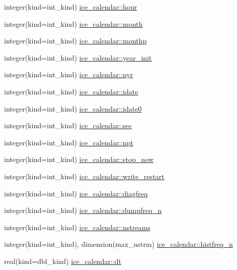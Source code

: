 \begin{DoxyCompactItemize}
integer(kind=int\_\-kind) \hyperlink{namespaceice__calendar_a0d6f497f4cdeb0413e2c5eadca76d8a1}{ice\_\-calendar::hour}
\item 
integer(kind=int\_\-kind) \hyperlink{namespaceice__calendar_a97f8410cf5a5f94b8c2a271c080c4bd7}{ice\_\-calendar::month}
\item 
integer(kind=int\_\-kind) \hyperlink{namespaceice__calendar_a2e88fbbaa94dea7baf4d46c950c5be7a}{ice\_\-calendar::monthp}
\item 
integer(kind=int\_\-kind) \hyperlink{namespaceice__calendar_afc3c91ad4e19b987b1e28293ec6ec2b7}{ice\_\-calendar::year\_\-init}
\item 
integer(kind=int\_\-kind) \hyperlink{namespaceice__calendar_ab1bfcde8457aafd600e9ff69b7ec6a3f}{ice\_\-calendar::nyr}
\item 
integer(kind=int\_\-kind) \hyperlink{namespaceice__calendar_aefc3f061e0c4d064b85e0fa84f0c92af}{ice\_\-calendar::idate}
\item 
integer(kind=int\_\-kind) \hyperlink{namespaceice__calendar_a60baa4e8bed2d175eaf6170ab792aa03}{ice\_\-calendar::idate0}
\item 
integer(kind=int\_\-kind) \hyperlink{namespaceice__calendar_a80ddbc12ee9fd336c3148dd0e31f420c}{ice\_\-calendar::sec}
\item 
integer(kind=int\_\-kind) \hyperlink{namespaceice__calendar_aac483d802138fd2e80f1945fb3385f35}{ice\_\-calendar::npt}
\item 
integer(kind=int\_\-kind) \hyperlink{namespaceice__calendar_a7d6b1e515218c3fa92e328b9cf745b59}{ice\_\-calendar::stop\_\-now}
\item 
integer(kind=int\_\-kind) \hyperlink{namespaceice__calendar_ab014cadf8e461a9743825f528cbd9e7a}{ice\_\-calendar::write\_\-restart}
\item 
integer(kind=int\_\-kind) \hyperlink{namespaceice__calendar_aec83d850502df509fde73dbd084c2dc5}{ice\_\-calendar::diagfreq}
\item 
integer(kind=int\_\-kind) \hyperlink{namespaceice__calendar_a0762fc870e55d2cfdfa80031188f4851}{ice\_\-calendar::dumpfreq\_\-n}
\item 
integer(kind=int\_\-kind) \hyperlink{namespaceice__calendar_ae00ad28547110901c77d6d4f2d87a7ea}{ice\_\-calendar::nstreams}
\item 
integer(kind=int\_\-kind), dimension(max\_\-nstrm) \hyperlink{namespaceice__calendar_ab7cea996ca05518dbde0dc027ee81c13}{ice\_\-calendar::histfreq\_\-n}
\item 
real(kind=dbl\_\-kind) \hyperlink{namespaceice__calendar_a8b89d489532c51cefe59876296c1f568}{ice\_\-calendar::dt}

\end{DoxyCompactItemize}
